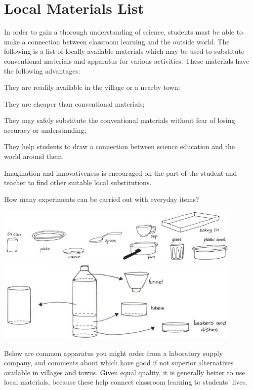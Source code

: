 
\chapter{Local Materials List}
\label{cha:local-materials}
In order to gain a thorough understanding of science, students must be able to make a connection between classroom learning and the outside world. The following is a list of locally available materials which may be used to substitute conventional materials and apparatus for various activities. These materials have the following advantages: 
\begin{itemize*}
\item They are readily available in the village or a nearby town;
\item They are cheaper than conventional materials; 
\item They may safely substitute the conventional materials without fear of losing accuracy or understanding; 
\item They help students to draw a connection between science education and the world around them.
\end{itemize*}
Imagination and innovativeness is encouraged on the part of the student and teacher to find other suitable local substitutions. 

How many experiments can be carried out with everyday items?

\begin{center}
\includegraphics[width=12cm]{./img/vso/using-local-materials.jpg}
\includegraphics[width=12cm]{./img/vso/multi-purpose-bottle.jpg}
\end{center}

Below are common apparatus you might order from a laboratory supply company, 
and comments about which have good if not superior alternatives 
available in villages and towns. 
Given equal quality, 
it is generally better to use local materials, 
because these help connect classroom learning to students' lives.\\

